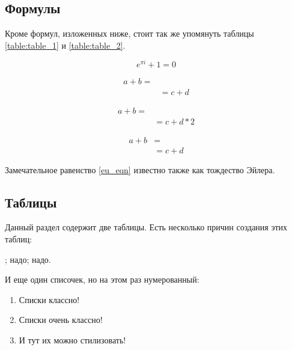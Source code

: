 \documentclass{article}
\begin{document}
\newpage

\subsection{Формулы} \label{s1:s4}

Кроме формул, изложенных ниже, стоит так же упомянуть таблицы \ref{table:table_1} и \ref{table:table_2}.

\begin{equation} \label{eu_eqn}
    e^{\pi i} + 1 = 0
\end{equation}

\begin{equation} \label{equ_1}
	\begin{matrix}
		a + b = \\
		& = c + d
	\end{matrix}
\end{equation}

\begin{equation} \label{equ_2}
	\begin{matrix}
		a + b = \\
		& = c + d * 2
	\end{matrix}
\end{equation}

\begin{align} \label{equ_3}
	a + b & = \nonumber \\
	& = c + d
\end{align}

Замечательное равенство \ref{eu_eqn} известно также как тождество Эйлера.

\newpage

\subsection{Таблицы} \label{s1:s5}

Данный раздел содержит две таблицы. Есть несколько причин создания этих таблиц:

\begin{itemize}
	;
	 надо;
	 надо.
\end{itemize}

И еще один списочек, но на этом раз нумерованный:

\begin{enumerate}
	\item Списки классно!
	\item Списки очень классно!
	\item И тут их можно стилизовать!
\end{enumerate}
\end{document}

